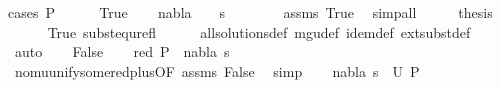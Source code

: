 \begin{isabellebody}
%
\isadelimproof
%
\endisadelimproof
%
\isatagproof
{}\isamarkupfalse%
{\isacharparenleft}{\kern0pt}cases\ {\isachardoublequoteopen}P\ {\isacharequal}{\kern0pt}\ {\isacharparenleft}{\kern0pt}{\isacharbrackleft}{\kern0pt}{\isacharbrackright}{\kern0pt}{\isacharcomma}{\kern0pt}{\isacharbrackleft}{\kern0pt}{\isacharbrackright}{\kern0pt}{\isacharparenright}{\kern0pt}{\isachardoublequoteclose}{\isacharparenright}{\kern0pt}\isanewline
\ \ \isamarkupfalse%
\ True\isanewline
\ \ \isamarkupfalse%
\ {\isachardoublequoteopen}nabla\ {\isacharequal}{\kern0pt}\ {\isacharbraceleft}{\kern0pt}{\isacharbraceright}{\kern0pt}{\isachardoublequoteclose}\ \ {\isachardoublequoteopen}s\ {\isacharequal}{\kern0pt}\ {\isacharbrackleft}{\kern0pt}{\isacharbrackright}{\kern0pt}{\isachardoublequoteclose}\isanewline
\ \ \ \ \isamarkupfalse%
\ assms\ True\ \isamarkupfalse%
\ simp{\isacharunderscore}{\kern0pt}all\isanewline
\ \ \isamarkupfalse%
\ \isamarkupfalse%
\ {\isacharquery}{\kern0pt}thesis\isanewline
\ \ \ \ \isamarkupfalse%
\ True\ subst{\isacharunderscore}{\kern0pt}equ{\isacharunderscore}{\kern0pt}refl\isanewline
\ \ \ \ \isamarkupfalse%
\ all{\isacharunderscore}{\kern0pt}solutions{\isacharunderscore}{\kern0pt}def\ mgu{\isacharunderscore}{\kern0pt}def\ idem{\isacharunderscore}{\kern0pt}def\ ext{\isacharunderscore}{\kern0pt}subst{\isacharunderscore}{\kern0pt}def\ \isamarkupfalse%
\ auto\isanewline
{}\isamarkupfalse%
\isanewline
\ \ \isamarkupfalse%
\ False\isanewline
\ \ \isamarkupfalse%
\ red{\isacharcolon}{\kern0pt}\ {\isachardoublequoteopen}P\ {\isasymTurnstile}\ {\isacharparenleft}{\kern0pt}nabla{\isacharcomma}{\kern0pt}\ s{\isacharparenright}{\kern0pt}\ {\isasymRightarrow}\ {\isacharparenleft}{\kern0pt}{\isacharbrackleft}{\kern0pt}{\isacharbrackright}{\kern0pt}{\isacharcomma}{\kern0pt}{\isacharbrackleft}{\kern0pt}{\isacharbrackright}{\kern0pt}{\isacharparenright}{\kern0pt}{\isachardoublequoteclose}\isanewline
\ \ \ \ \isamarkupfalse%
\ nomu{\isacharunderscore}{\kern0pt}unify{\isacharunderscore}{\kern0pt}some{\isacharunderscore}{\kern0pt}red{\isacharunderscore}{\kern0pt}plus{\isacharbrackleft}{\kern0pt}OF\ assms\ False{\isacharbrackright}{\kern0pt}\ \isamarkupfalse%
\ simp\isanewline
\ \ \isamarkupfalse%
\ {\isachardoublequoteopen}{\isacharparenleft}{\kern0pt}nabla{\isacharcomma}{\kern0pt}\ s{\isacharparenright}{\kern0pt}\ {\isasymin}\ U\ P{\isachardoublequoteclose}\isanewline

\end{isabellebody}
